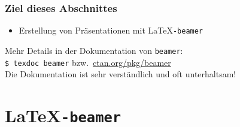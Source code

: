 
\subtitle{Präsentationen}
\date{2017-05-29}



\begin{frame}[label=ziel]
  \frametitle{Ziel dieses Abschnittes}

  \onslide<+->
  \begin{itemize}
  \item Erstellung von Präsentationen mit \LaTeX\texttt{-beamer}
  \end{itemize}

  \onslide<+->

  \bigskip

  Mehr Details in der Dokumentation von \texttt{beamer}:\\
  \vspace*{\baselineskip}
  \qquad\texttt{\$ texdoc beamer} bzw.\ \url{ctan.org/pkg/beamer}\\
  \vspace*{\baselineskip}
  Die Dokumentation ist sehr verständlich und oft unterhaltsam!

\end{frame}

\section{\LaTeX\texttt{-beamer}}




